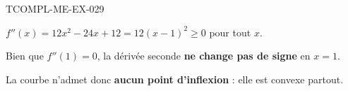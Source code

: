 \begin{corrige}{TCOMPL-ME-EX-029}

$f''(x) = 12x^2 - 24x + 12 = 12(x-1)^2 \geq 0$ pour tout $x$.


Bien que $f''(1) = 0$, la dérivée seconde \textbf{ne change pas de signe} en $x=1$.

La courbe n'admet donc \textbf{aucun point d'inflexion} : elle est convexe partout.

\end{corrige}
